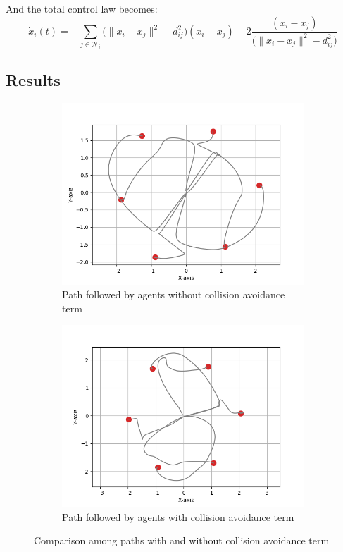 \documentclass[a4paper,11pt,oneside]{book}
\begin{document}
And the total control law becomes:
\begin{equation}
\dot{x}_i(t) = - \sum_{j \in \mathcal{N}_i} \bigg( \lVert x_i - x_j \rVert^2 - d_{ij}^2 \bigg) (x_i - x_j ) - 2 \frac{(x_i-x_j)}{\bigg( \lVert x_i - x_j \rVert^2 - d_{ij}^2 \bigg)}
\label{Dynamics_with_collision_avoidance}
\end{equation}

\subsection{Results}
\begin{figure}[h]
\centering
	\begin{subfigure}{0.49\textwidth}	
	\includegraphics[scale=0.42]{Hexagon_path}
	\caption{Path followed by agents without collision avoidance term}
	\end{subfigure}
\hfill
	\begin{subfigure}{0.49\textwidth}	
	\includegraphics[scale=0.42]{Hexagon_path_collision}
	\caption{Path followed by agents with collision avoidance term}
	\end{subfigure}
\caption{Comparison among paths with and without collision avoidance term}
\label{Paths_comparison}
\end{figure}
\end{document}
